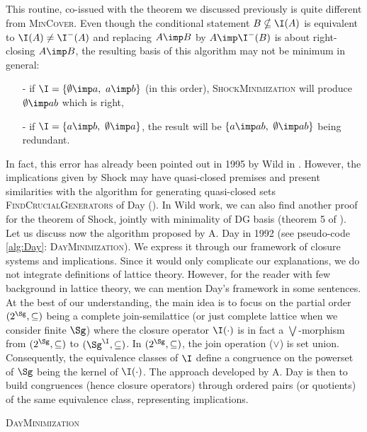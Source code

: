 This routine, co-issued with the theorem we discussed previously is 
quite different from \textsc{MinCover}. Even though the conditional statement 
$B \nsubseteq \I(A)$ is equivalent to $\I(A) \neq \I^{-}(A)$ and 
replacing $A \imp B$ by $A \imp \I^{-}(B)$ is about right-closing $A \imp B$, 
the resulting basis of this algorithm may not be minimum in
general:
\begin{itemize}
	\item[-] if $\I = \{ \emptyset \imp a, \ a \imp b \}$ (in this order), 
	\textsc{ShockMinimization} will produce $\emptyset \imp ab$ which is right,
	\item[-] if $\I = \{ a \imp b, \ \emptyset \imp a \}$, the result will
	be $\{ a \imp ab, \ \emptyset \imp ab \}$ being redundant.
\end{itemize} 
In fact, this error has already been pointed out in 1995 by Wild in 
\cite{wild_computations_1995}. However, the implications given by Shock may have quasi-closed premises and present similarities with the algorithm for generating quasi-closed sets \textsc{FindCrucialGenerators} of Day (\cite{day_lattice_1992}). In Wild work, we can also find another proof for the theorem of Shock, jointly with minimality of DG basis (theorem 5 of \cite{wild_theory_1994, wild_computations_1995}). Let us discuss now the algorithm proposed by A. Day in 1992 (see pseudo-code \ref{alg:Day}: \textsc{DayMinimization}). We express it through our framework of closure systems and implications. Since it would only complicate our explanations, we do not integrate definitions of lattice theory. However, for the reader with few background in lattice theory, we can mention Day's framework in some sentences. At the best of our understanding, the main idea is to focus on the partial order $(2^{\Sg}, \subseteq)$ being a complete join-semilattice (or just complete lattice when we consider finite $\Sg$) where the closure operator $\I(\cdot)$ is in fact a $\bigvee$-morphism from $(2^{\Sg}, \subseteq)$ to $(\Sg^{\I}, \subseteq)$. In $(2^{\Sg}, \subseteq)$, the join operation ($\lor$) is set union. Consequently, the equivalence classes of $\I$ define a congruence on the powerset of $\Sg$ being the kernel of $\I(\cdot)$. The approach developed by A. Day is then to build congruences (hence closure operators) through ordered pairs (or quotients) of the same equivalence class, representing implications.

\begin{algorithm}
	
	\BlankLine
	\BlankLine
	
	
	\caption{\textsc{DayMinimization}}
	\label{alg:Day}
\end{algorithm}

